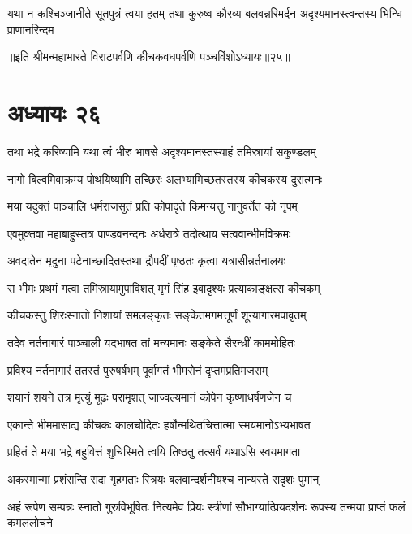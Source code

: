 \threelineshloka
{यथा न कश्चिञ्जानीते सूतपुत्रं त्वया हतम्}
{तथा कुरुष्व कौरव्य बलवन्नरिमर्दन}
{अदृश्यमानस्त्वन्तस्य भिन्धि प्राणानरिन्दम}

॥इति श्रीमन्महाभारते विराटपर्वणि कीचकवधपर्वणि पञ्चविंशोऽध्यायः॥२५॥

\chapter{अध्यायः २६}

\twolineshloka
{तथा भद्रे करिष्यामि यथा त्वं भीरु भाषसे}
{अदृश्यमानस्तस्याहं तमिस्रायां सकुण्डलम्}


\twolineshloka
{नागो बिल्वमिवाक्रम्य पोथयिष्यामि तच्छिरः}
{अलभ्यामिच्छतस्तस्य कीचकस्य दुरात्मनः}


\twolineshloka
{मया यदुक्तं पाञ्चालि धर्मराजसुतं प्रति}
{कोपादृते किमन्यत्तु नानुवर्तेत को नृपम्}



\twolineshloka
{एवमुक्तवा महाबाहुस्तत्र पाण्डवनन्दनः}
{अर्धरात्रे तदोत्थाय सत्ववान्भीमविक्रमः}


\twolineshloka
{अवदातेन मृदुना पटेनाच्छादितस्तथा}
{द्रौपदीं पृष्ठतः कृत्वा यत्रासीन्नर्तनालयः}


\twolineshloka
{स भीमः प्रथमं गत्वा तमिस्रायामुपाविशत्}
{मृगं सिंह इवादृश्यः प्रत्याकाङ्क्षत्स कीचकम्}


\twolineshloka
{कीचकस्तु शिरःस्नातो निशायां समलङ्कृतः}
{सङ्केतमगमत्तूर्णं शून्यागारमपावृतम्}


\twolineshloka
{तदेव नर्तनागारं पाञ्चाली यदभाषत}
{तां मन्यमानः सङ्केते सैरन्ध्रीं काममोहितः}


\twolineshloka
{प्रविश्य नर्तनागारं ततस्तं पुरुषर्षभम्}
{पूर्वागतं भीमसेनं दृप्तमप्रतिमजसम्}


\twolineshloka
{शयानं शयने तत्र मृत्युं मूढः परामृशत्}
{जाज्वल्यमानं कोपेन कृष्णाधर्षणजेन च}


\twolineshloka
{एकान्ते भीममासाद्य कीचकः कालचोदितः}
{हर्षोन्मथितचित्तात्मा स्मयमानोऽभ्यभाषत}


\twolineshloka
{प्रहितं ते मया भद्रे बहुवित्तं शुचिस्मिते}
{त्वयि तिष्ठतु तत्सर्वं यथाऽसि स्वयमागता}


\twolineshloka
{अकस्मान्मां प्रशंसन्ति सदा गृहगताः स्त्रियः}
{बलवान्दर्शनीयश्च नान्यस्ते सदृशः पुमान्}


\threelineshloka
{अहं रूपेण सम्पन्नः स्नातो गुरुविभूषितः}
{नित्यमेव प्रियः स्त्रीणां सौभाग्यात्प्रियदर्शनः}
{रूपस्य तन्मया प्राप्तं फलं कमललोचने}




